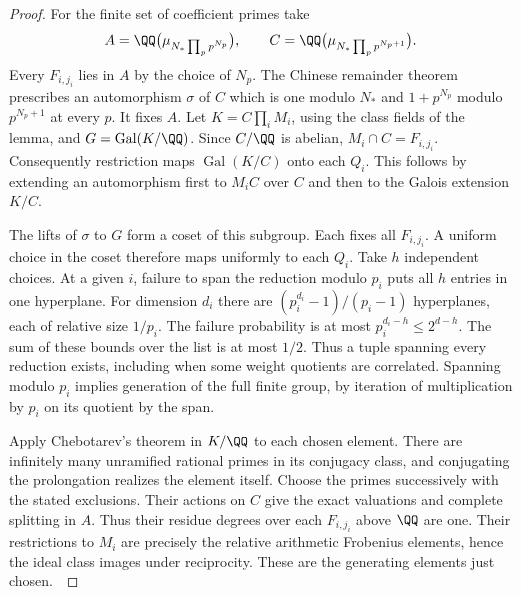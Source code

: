 \documentclass[a4paper,11pt]{article}
\theoremstyle{definition}
\theoremstyle{remark}
\numberwithin{equation}{section}
\begin{document}
\begin{proof}
For the finite set of coefficient primes take
\[
 A=\QQ\bigl(\mu_{N_*\prod_p p^{N_p}}\bigr),\qquad
 C=\QQ\bigl(\mu_{N_*\prod_p p^{N_p+1}}\bigr).
\]
Every \(F_{i,j_i}\) lies in \(A\) by the choice of \(N_p\).
The Chinese remainder theorem prescribes an automorphism
\(\sigma\) of \(C\) which is one modulo \(N_*\) and
\(1+p^{N_p}\) modulo \(p^{N_p+1}\) at every \(p\).
It fixes \(A\). Let \(K=C\prod_i M_i\), using the class
fields of the lemma, and \(G=\operatorname{Gal}(K/\QQ)\).
Since \(C/\QQ\) is abelian,
\(M_i\cap C=F_{i,j_i}\). Consequently restriction maps
\(\operatorname{Gal}(K/C)\) onto each \(Q_i\). This follows
by extending an automorphism first to \(M_i C\) over \(C\)
and then to the Galois extension \(K/C\).

The lifts of \(\sigma\) to \(G\) form a coset of this
subgroup. Each fixes all \(F_{i,j_i}\). A uniform choice
in the coset therefore maps uniformly to each \(Q_i\).
Take \(h\) independent choices. At a given \(i\), failure
to span the reduction modulo \(p_i\) puts all \(h\) entries
in one hyperplane. For dimension \(d_i\) there are
\((p_i^{d_i}-1)/(p_i-1)\) hyperplanes, each of relative
size \(1/p_i\). The failure probability is at most
\(p_i^{d_i-h}\le2^{d-h}\). The sum of these bounds over
the list is at most \(1/2\). Thus a tuple spanning every
reduction exists, including when some weight quotients are
correlated. Spanning modulo \(p_i\) implies generation of
the full finite group, by iteration of multiplication by
\(p_i\) on its quotient by the span.

Apply Chebotarev's theorem in \(K/\QQ\) to each chosen
element. There are infinitely many unramified rational
primes in its conjugacy class, and conjugating the
prolongation realizes the element itself. Choose the
primes successively with the stated exclusions.
Their actions on \(C\) give the exact valuations and
complete splitting in \(A\). Thus their residue degrees
over each \(F_{i,j_i}\) above \(\QQ\) are one. Their
restrictions to \(M_i\) are precisely the relative
arithmetic Frobenius elements, hence the ideal class
images under reciprocity. These are the generating
elements just chosen.~\cite{XI-VIII-I-tz50}


\end{proof}
\end{document}
